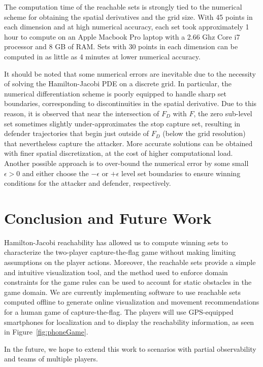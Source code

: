 \documentclass[letterpaper, 10 pt, conference]{ieeeconf}  %
\numberwithin{algorithm}{section}
\begin{document}
The computation time of the reachable sets is strongly tied to the numerical scheme for obtaining the spatial derivatives and the grid size. With 45 points in each dimension and at high numerical accuracy, each set took approximately 1 hour to compute on an Apple Macbook Pro laptop with a 2.66 Ghz Core i7 processor and 8 GB of RAM. Sets with 30 points in each dimension can be computed in as little as 4 minutes at lower numerical accuracy. 

It should be noted that some numerical errors are inevitable due to the necessity of solving  the Hamilton-Jacobi PDE on a discrete grid. In particular, the numerical differentiation scheme is poorly equipped to handle sharp set boundaries, corresponding to discontinuities in the spatial derivative. Due to this reason, it is observed that near the intersection of $F_D$ with $F$, the zero sub-level set sometimes slightly under-approximates the stop capture set, resulting in defender trajectories that begin just outside of $F_D$ (below the grid resolution) that nevertheless capture the attacker. More accurate solutions can be obtained with finer spatial discretization, at the cost of higher computational load. Another possible approach is to over-bound the numerical error by some small $\epsilon > 0$ and either choose the $-\epsilon$ or $+\epsilon$ level set boundaries to ensure winning conditions for the attacker and defender, respectively.


\section{Conclusion and Future Work}
\label{sec:conc}
Hamilton-Jacobi reachability has allowed us to compute winning sets to characterize the two-player capture-the-flag game without making limiting assumptions on the player actions. Moreover, the reachable sets provide a simple and intuitive visualization tool, and the method used to enforce domain constraints for the game rules can be used to account for static obstacles in the game domain. We are currently implementing software to use reachable sets computed offline to generate online visualization and movement recommendations for a human game of capture-the-flag. The players will use GPS-equipped smartphones for localization and to display the reachability information, as seen in Figure~\ref{fig:phoneGame}.

In the future, we hope to extend this work to scenarios with partial observability and teams of multiple players. 
\end{document}
